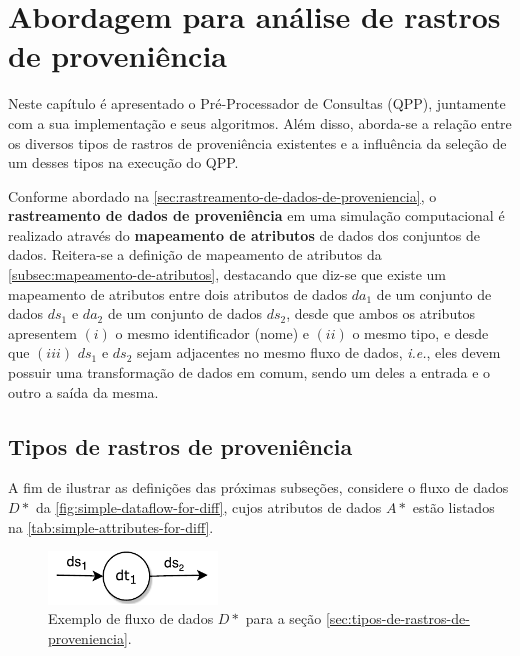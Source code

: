 
\chapter{Abordagem para análise de rastros de proveniência}%
\label{chap:rastros-de-proveniencia}

Neste capítulo é apresentado o Pré-Processador de Consultas (QPP), juntamente com a sua implementação e seus algoritmos. Além disso, aborda-se a relação entre os diversos tipos de rastros de proveniência existentes e a influência da seleção de um desses tipos na execução do QPP.

Conforme abordado na \autoref{sec:rastreamento-de-dados-de-proveniencia}, o \textbf{rastreamento de dados de proveniência} em uma simulação computacional é realizado através do \textbf{mapeamento de atributos} de dados dos conjuntos de dados. Reitera-se a definição de mapeamento de atributos da \autoref{subsec:mapeamento-de-atributos}, destacando que diz-se que existe um mapeamento de atributos entre dois atributos de dados \(da_1\) de um conjunto de dados \(ds_1\) e \(da_2\) de um conjunto de dados \(ds_2\), desde que ambos os atributos apresentem \((i)\) o mesmo identificador (nome) e \((ii)\) o mesmo tipo, e desde que \((iii)\) \(ds_1\) e \(ds_2\) sejam adjacentes no mesmo fluxo de dados, \textit{i.e.}, eles devem possuir uma transformação de dados em comum, sendo um deles a entrada e o outro a saída da mesma.

\section{Tipos de rastros de proveniência}%
\label{sec:tipos-de-rastros-de-proveniencia}

A fim de ilustrar as definições das próximas subseções, considere o fluxo de dados  \(D\ast\) da \autoref{fig:simple-dataflow-for-diff}, cujos atributos de dados \(A\ast\) estão listados na \autoref{tab:simple-attributes-for-diff}. 

\begin{figure}[htb]
    \centering
    \includegraphics[width=0.4\textwidth]{img/simple-dataflow-for-diff}
    \caption[Exemplo de fluxo de dados para a seção \autoref{sec:tipos-de-rastros-de-proveniencia}]{Exemplo de fluxo de dados \(D\ast\) para a seção \autoref{sec:tipos-de-rastros-de-proveniencia}.}%
    \label{fig:simple-dataflow-for-diff}
\end{figure}

